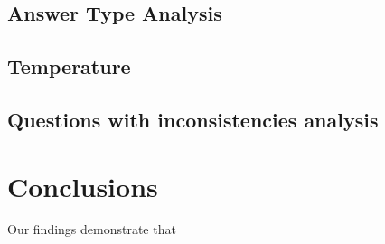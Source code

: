 \documentclass[11pt]{article}
\begin{document}
\subsection{Answer Type Analysis} %

\subsection{Temperature} %




\subsection{Questions with inconsistencies analysis}  %



\section{Conclusions}
Our findings demonstrate that 




\end{document}
